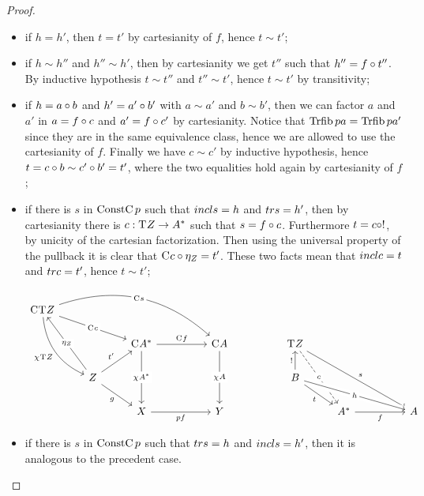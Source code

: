 \documentclass{lmcs} %
\theoremstyle{plain}\newtheorem{satz}[thm]{Satz} %
\begin{document}
\begin{proof}
				\begin{itemize}
					\item if $h=h'$, then $t=t'$ by cartesianity of $f$, hence $t\sim t'$;
					\item if $h\sim h''$ and $h''\sim h'$, then by cartesianity we get $t''$ such that $h''=f\circ t''$. By inductive hypothesis $t\sim t''$ and $t''\sim t'$, hence $t\sim t'$ by transitivity;
					\item if $h=a\circ b$ and $h'=a'\circ b'$ with $a\sim a'$ and $b\sim b'$, then we can factor $a$ and $a'$ in $a=f\circ c$ and $a'=f\circ c'$ by cartesianity. Notice that $\mathop{\mathrm{Trfib}}\nolimits pa=\mathop{\mathrm{Trfib}}\nolimits pa'$ since they are in the same equivalence class, hence we are allowed to use the cartesianity of $f$. Finally we have $c\sim c'$ by inductive hypothesis, hence $t=c\circ b\sim c'\circ b'=t'$, where the two equalities hold again by cartesianity of $f$;
					\item if there is $s$ in $\mathop{\mathrm{ConstC}}\nolimits{p}$ such that $incl s=h$ and $tr s= h'$, then by cartesianity there is $c:\mathrm{T}^{}Z\to A^*$ such that $s=f\circ c$. Furthermore $t=c\circ !$, by unicity of the cartesian factorization. Then using the universal property of the pullback it is clear that $\mathrm{C}^{}c\circ \eta_Z=t'$. These two facts mean that $incl c=t$ and $tr c=t'$, hence $t\sim t'$;
					\[\begin{tikzcd}
						{\comp{}\term{}Z} &&&&&&&&& \\
						&& {\comp{}\reind{A}} && {\comp{}A} && {\term{}Z} \\
						& Z &&&&& B \\
						&& X && Y &&& {\reind{A}} && A
						\arrow["{\comp{}c}"{description}, from=1-1, to=2-3]
						\arrow["{\comp{}s}"{description}, bend left, from=1-1, to=2-5]
						\arrow["{\jcomp{}\term{}Z}"', bend right, from=1-1, to=3-2]
						\arrow["{\comp{}f}", from=2-3, to=2-5]
						\arrow["{\jcomp{}\reind{A}}"{description}, from=2-3, to=4-3]
						\arrow["{\jcomp{}A}"{description}, from=2-5, to=4-5]
						\arrow["c"{description}, dashed, from=2-7, to=4-8]
						\arrow["s", from=2-7, to=4-10]
						\arrow["{\eta_Z}"{description}, from=3-2, to=1-1]
						\arrow["{t'}", from=3-2, to=2-3]
						\arrow["g"', from=3-2, to=4-3]
						\arrow["{!}", from=3-7, to=2-7]
						\arrow["t"', from=3-7, to=4-8]
						\arrow["h"{description}, from=3-7, to=4-10, crossing over]
						\arrow["pf"', from=4-3, to=4-5]
						\arrow["f"', from=4-8, to=4-10]
					\end{tikzcd}\]
					\item if there is $s$ in $\mathop{\mathrm{ConstC}}\nolimits{p}$ such that $tr s= h$ and $incl s=h'$, then it is analogous to the precedent case.
				\end{itemize}
			\end{proof}
\end{document}
